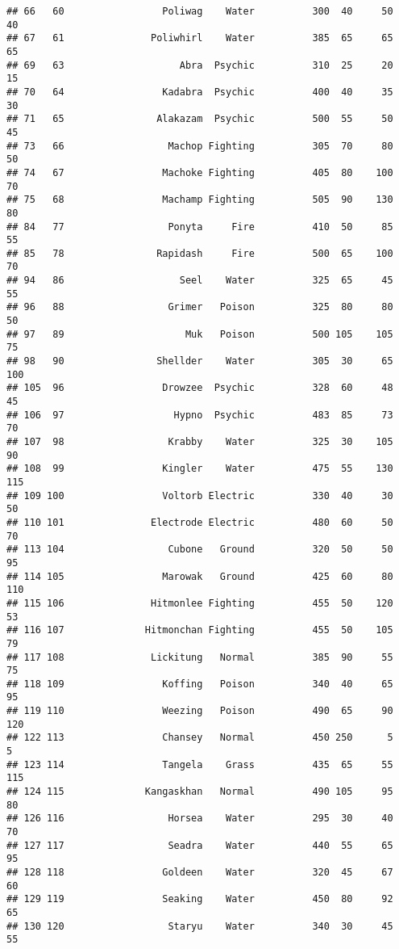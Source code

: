 \documentclass[
]{article}
\begin{document}
\begin{verbatim}
## 66   60                 Poliwag    Water          300  40     50      40
## 67   61               Poliwhirl    Water          385  65     65      65
## 69   63                    Abra  Psychic          310  25     20      15
## 70   64                 Kadabra  Psychic          400  40     35      30
## 71   65                Alakazam  Psychic          500  55     50      45
## 73   66                  Machop Fighting          305  70     80      50
## 74   67                 Machoke Fighting          405  80    100      70
## 75   68                 Machamp Fighting          505  90    130      80
## 84   77                  Ponyta     Fire          410  50     85      55
## 85   78                Rapidash     Fire          500  65    100      70
## 94   86                    Seel    Water          325  65     45      55
## 96   88                  Grimer   Poison          325  80     80      50
## 97   89                     Muk   Poison          500 105    105      75
## 98   90                Shellder    Water          305  30     65     100
## 105  96                 Drowzee  Psychic          328  60     48      45
## 106  97                   Hypno  Psychic          483  85     73      70
## 107  98                  Krabby    Water          325  30    105      90
## 108  99                 Kingler    Water          475  55    130     115
## 109 100                 Voltorb Electric          330  40     30      50
## 110 101               Electrode Electric          480  60     50      70
## 113 104                  Cubone   Ground          320  50     50      95
## 114 105                 Marowak   Ground          425  60     80     110
## 115 106               Hitmonlee Fighting          455  50    120      53
## 116 107              Hitmonchan Fighting          455  50    105      79
## 117 108               Lickitung   Normal          385  90     55      75
## 118 109                 Koffing   Poison          340  40     65      95
## 119 110                 Weezing   Poison          490  65     90     120
## 122 113                 Chansey   Normal          450 250      5       5
## 123 114                 Tangela    Grass          435  65     55     115
## 124 115              Kangaskhan   Normal          490 105     95      80
## 126 116                  Horsea    Water          295  30     40      70
## 127 117                  Seadra    Water          440  55     65      95
## 128 118                 Goldeen    Water          320  45     67      60
## 129 119                 Seaking    Water          450  80     92      65
## 130 120                  Staryu    Water          340  30     45      55

\end{verbatim}
\end{document}
